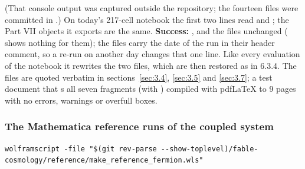 (That console output was captured outside the repository; the fourteen files were committed in .) On today's 217-cell notebook the first two lines read  and ; the Part VII objects it exports are the same. \textbf{Success:} , and the  files unchanged ( shows nothing for them); the  files carry the date of the run in their header comment, so a re-run on another day changes that one line. Like every evaluation of the notebook it rewrites the two  files, which are then restored as in 6.3.4. The  files are quoted verbatim in sections~\ref{sec:3.4}, \ref{sec:3.5} and \ref{sec:3.7}; a test document that s all seven  fragments (with ) compiled with pdfLaTeX to 9 pages with no errors, warnings or overfull boxes.

\subsubsection{The Mathematica reference runs of the coupled system}
\label{sec:6.3.7}

\begin{Verbatim}
wolframscript -file "$(git rev-parse --show-toplevel)/fable-cosmology/reference/make_reference_fermion.wls"
\end{Verbatim}

